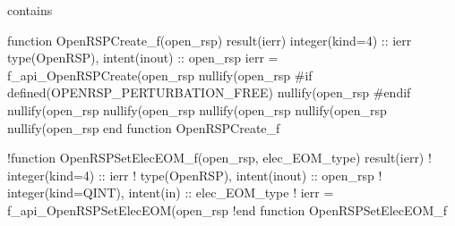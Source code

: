    contains

    function OpenRSPCreate_f(open_rsp) result(ierr)
        integer(kind=4) :: ierr
        type(OpenRSP), intent(inout) :: open_rsp
        ierr = f_api_OpenRSPCreate(open_rsp%
        nullify(open_rsp%
#if defined(OPENRSP_PERTURBATION_FREE)
        nullify(open_rsp%
#endif
        nullify(open_rsp%
        nullify(open_rsp%
        nullify(open_rsp%
        nullify(open_rsp%
        nullify(open_rsp%
    end function OpenRSPCreate_f

    !function OpenRSPSetElecEOM_f(open_rsp, elec_EOM_type) result(ierr)
    !    integer(kind=4) :: ierr
    !    type(OpenRSP), intent(inout) :: open_rsp
    !    integer(kind=QINT), intent(in) :: elec_EOM_type
    !    ierr = f_api_OpenRSPSetElecEOM(open_rsp%
    !end function OpenRSPSetElecEOM_f

